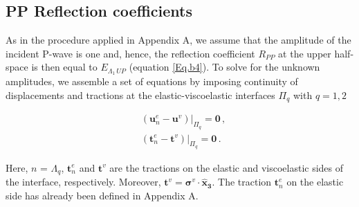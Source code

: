 \documentclass[draft]{agujournal2019}
\begin{document}
\subsection{PP Reflection coefficients}
As in the procedure applied in Appendix A, we assume that the amplitude of the incident P-wave is one and, hence, the reflection coefficient $R_{PP}$ at the upper half-space is then equal to $E_{\Lambda_1\, UP}$ (equation \eqref{Eq.b4}). To solve for the unknown amplitudes, we assemble a set of equations by imposing continuity of displacements and tractions at the elastic-viscoelastic interfaces $\Pi_q$ with $q=1,2$
\begin{linenomath*}
\begin{equation}\label{Eq.b10}
\begin{split}
&  \left. \left(  \bm{u}_n^e -  \bm{u}^v \right) \right \rvert_{\Pi_q} = \bm{0} \,, \\
&  \left. \left( \bm{t}_n^e  - \bm{t}^v  \right) \right \rvert_{\Pi_q} = \bm{0} \,.
\end{split}
\end{equation}
\end{linenomath*}
Here, $n$ = $\Lambda_q$, $\bm{t}_n^e$ and $\bm{t}^v$ are the tractions on the elastic and viscoelastic sides of the interface, respectively. Moreover, $\bm{t}^v =\bm{\sigma}^v \cdot \bm{\hat {x}_3} $. The traction $\bm{t}_n^e$ on the elastic side has already been defined in Appendix A.


\end{document}
